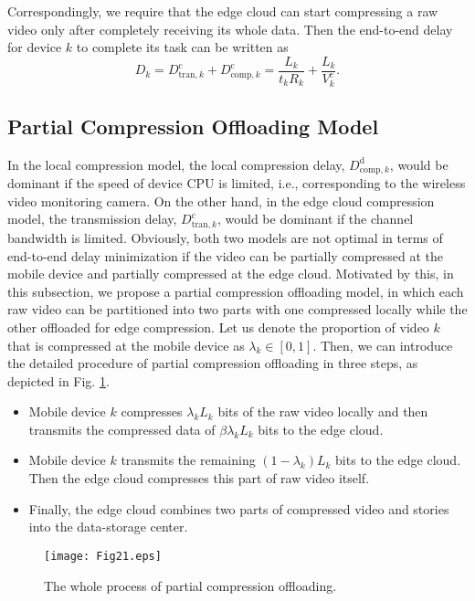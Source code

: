 \documentclass[journal,draftcls,onecolumn,12pt,twoside]{IEEEtran}
\begin{document}
Correspondingly, we require that the edge cloud can start compressing a raw video only after completely receiving its whole data. Then the end-to-end delay for device $k$ to complete its task can be written as
\begin{equation}
    D_k = D_{\text{tran},k}^{\text{c}} + D_{\text{comp},k}^{\text{c}} = \frac{L_k}{t_k R_k}+\frac{L_k}{V_k^{\text{c}}}. \label{4}
\end{equation}

\subsection{Partial Compression Offloading Model}
In the local compression model, the local compression delay, $D_{\text{comp},k}^{\text{d}}$, would be dominant if the speed of device CPU is limited, i.e., corresponding to the wireless video monitoring camera. On the other hand, in the edge cloud compression model, the transmission delay, $D_{\text{tran},k}^{\text{c}}$, would be dominant if the channel bandwidth is limited. Obviously, both two models are not optimal in terms of end-to-end delay minimization if the video can be partially compressed at the mobile device and partially compressed at the edge cloud. Motivated by this, in this subsection, we propose a partial compression offloading model, in which each raw video can be partitioned into two parts with one compressed locally while the other offloaded for edge compression. Let us denote the proportion of video $k$ that is compressed at the mobile device as $\lambda_k\in \left[0,1\right]$. Then, we can introduce the detailed procedure of partial compression offloading in three steps, as depicted in Fig. \ref{Partial compression offloading}.
\begin{itemize}
	\item Mobile device $k$ compresses $\lambda_k L_k$ bits of the raw video locally and then transmits the compressed data of $\beta \lambda_k L_k$ bits to the edge cloud.
	\item Mobile device $k$ transmits the remaining $(1-\lambda_k)L_k$ bits to the edge cloud. Then the edge cloud compresses this part of raw video itself.
    \item Finally, the edge cloud combines two parts of compressed video and stories into the data-storage center.
\end{itemize}
\begin{figure}[!htp]
	\centering
	\texttt{[image: Fig21.eps]}
	\caption{The whole process of partial compression offloading.}	
	\label{Partial compression offloading}
\end{figure}
\end{document}
